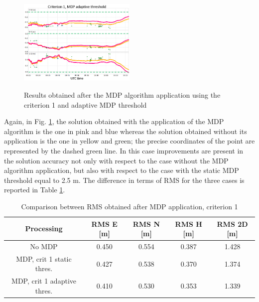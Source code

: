 \begin{figure}[H] 
	\centering
    {\includegraphics[width=0.50\textwidth]{fig/test4mpd/crit1_mdp_adaptive.png}}
    \caption{Results obtained after the MDP algorithm application using the criterion 1 and adaptive MDP threshold}
	\label{FIG:test4mdp_crit1mdpadaptive} 
\end{figure}

Again, in Fig. \ref{FIG:test4mdp_crit1mdpadaptive}, the solution obtained with the application of the MDP algorithm is the one in pink and blue whereas  the solution obtained without its application is the one in yellow and green; the precise coordinates of the point are represented by the dashed green line.
In this case  improvements are present in the solution accuracy not only with respect to the case without the MDP algorithm application, but also with respect to the case with the static MDP threshold equal to 2.5 m. The difference in terms of RMS for the three cases is reported in Table \ref{tab:mdp_c1_rms}.

\begin{table}[H]
	\centering
	\begin{tabular}{|c|c|c|c|c|}
	\hline
	\textbf{Processing} & \textbf{RMS E [m]} & \textbf{RMS N [m]} &
	\textbf{RMS H [m]} &
	\textbf{RMS 2D [m]}\\
    \hline
	No MDP & 0.450 & 0.554& 0.387&1.428\\ 
    \hline
	MDP, crit 1 static thres. & 0.427 & 0.538& 0.370&1.374\\
    \hline
    MDP, crit 1 adaptive thres. & 0.410 & 0.530 & 0.353&1.339\\  
    \hline
	\end{tabular} 
	\caption{Comparison between RMS obtained after MDP application, criterion 1 }
	\label{tab:mdp_c1_rms}
\end{table}

